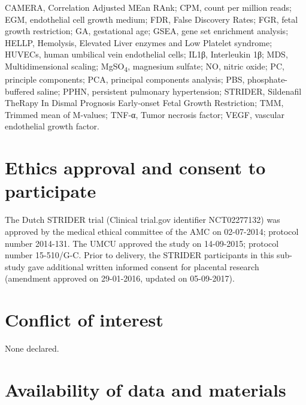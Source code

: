 \documentclass[authordate, empirical,issue]{jote-new-article}
\begin{document}
CAMERA, Correlation Adjusted MEan RAnk; CPM, count per million reads; EGM, endothelial cell growth medium; FDR, False Discovery Rates; FGR, fetal growth restriction; GA, gestational age; GSEA, gene set enrichment analysis; HELLP, Hemolysis, Elevated Liver enzymes and Low Platelet syndrome; HUVECs, human umbilical vein endothelial cells; IL1β, Interleukin 1β; MDS, Multidimensional scaling; MgSO\textsubscript{4}, magnesium sulfate; NO, nitric oxide; PC, principle components; PCA, principal components analysis; PBS, phosphate-buffered saline; PPHN, persistent pulmonary hypertension; STRIDER, Sildenafil TheRapy In Dismal Prognosis Early-onset Fetal Growth Restriction; TMM, Trimmed mean of M-values; TNF-α, Tumor necrosis factor; VEGF, vascular endothelial growth factor.















\section{Ethics approval and consent to participate}



The Dutch STRIDER trial (Clinical trial.gov identifier NCT02277132) was approved by the medical ethical committee of the AMC on 02-07-2014; protocol number 2014-131. The UMCU approved the study on 14-09-2015; protocol number 15-510/G-C. Prior to delivery, the STRIDER participants in this sub-study gave additional written informed consent for placental research (amendment approved on 29-01-2016, updated on 05-09-2017).







\section{Conflict of interest}



None declared.



\section{Availability of data and materials}
\end{document}
